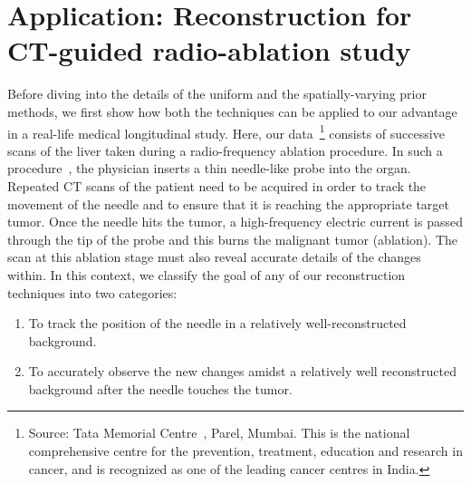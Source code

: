 \documentclass[journal]{IEEEtran}
\begin{document}

\section{Application: Reconstruction for CT-guided radio-ablation study}
\label{sec:tmh}
Before diving into the details of the uniform and the
spatially-varying prior methods, we first show how both the
techniques can be applied to our advantage in a real-life medical
longitudinal study. Here, our data~\footnote{Source: Tata Memorial
  Centre~\cite{tmh}, Parel, Mumbai.  This is the national
  comprehensive centre for the prevention, treatment, education and
  research in cancer, and is recognized as one of the leading cancer
  centres in India.} consists of successive scans of the liver taken
during a radio-frequency ablation procedure. In such a
procedure~\cite{Dong2015}, the physician inserts a thin needle-like
probe into the organ. Repeated CT scans of the patient need to be
acquired in order to track the movement of the needle and to ensure
that it is reaching the appropriate target tumor. Once the needle hits
the tumor, a high-frequency electric current is passed through the tip
of the probe and this burns the malignant tumor (ablation). The scan
at this ablation stage must also reveal accurate details of the
changes within. In this context, we classify the goal of any of our
reconstruction techniques into two categories: 
\begin{enumerate}
\item To track the position of the needle in a relatively well-reconstructed background.%
\item To accurately observe the new changes amidst a relatively well reconstructed background after the needle touches the tumor.%
\end{enumerate} 
\end{document}
